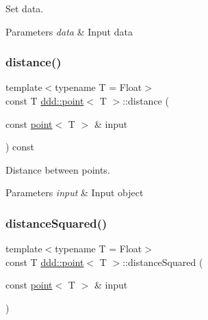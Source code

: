 Set data. 


\begin{DoxyParams}{Parameters}
{\em data} & Input data \\
\hline
\end{DoxyParams}
\mbox{\label{classddd_1_1point_a59d8714cc178090ddf75b0c9dbd832c9}} 
\subsubsection{\texorpdfstring{distance()}{distance()}}
{\footnotesize\ttfamily template$<$typename T = Float$>$ \\
const T \hyperlink{classddd_1_1point}{ddd\+::point}$<$ T $>$\+::distance (\begin{DoxyParamCaption}\item[{const \hyperlink{classddd_1_1point}{point}$<$ T $>$ \&}]{input }\end{DoxyParamCaption}) const\hspace{0.3cm}{\ttfamily [inline]}}



Distance between points. 


\begin{DoxyParams}{Parameters}
{\em input} & Input object \\
\hline
\end{DoxyParams}
\mbox{\label{classddd_1_1point_a4b6793fd154fc9ad4dd93a4927d4ee13}} 
\subsubsection{\texorpdfstring{distance\+Squared()}{distanceSquared()}}
{\footnotesize\ttfamily template$<$typename T = Float$>$ \\
const T \hyperlink{classddd_1_1point}{ddd\+::point}$<$ T $>$\+::distance\+Squared (\begin{DoxyParamCaption}\item[{const \hyperlink{classddd_1_1point}{point}$<$ T $>$ \&}]{input }\end{DoxyParamCaption})\hspace{0.3cm}{\ttfamily [inline]}}



